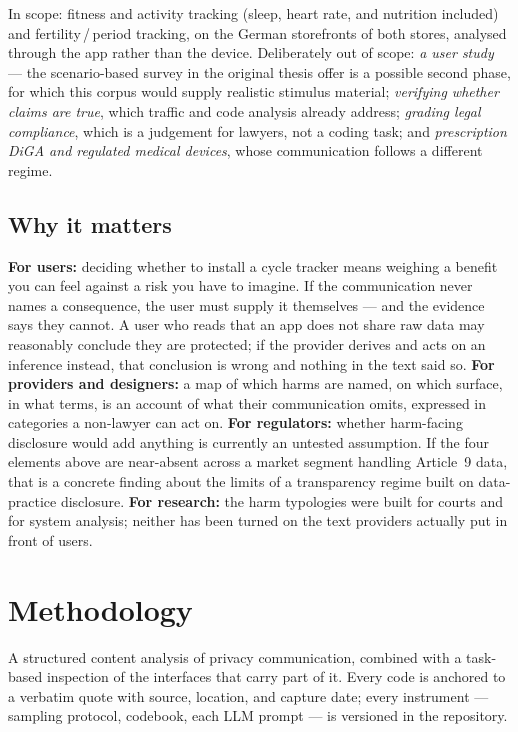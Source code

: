 \documentclass[10pt,a4paper]{article}
\begin{document}
In scope: fitness and activity tracking (sleep, heart rate, and nutrition
included) and fertility\,/\,period tracking, on the German storefronts of both
stores, analysed through the app rather than the device. Deliberately out of
scope: \emph{a user study} --- the scenario-based survey in the original thesis
offer is a possible second phase, for which this corpus would supply realistic
stimulus material; \emph{verifying whether claims are true}, which traffic and
code analysis already address; \emph{grading legal compliance}, which is a
judgement for lawyers, not a coding task; and \emph{prescription DiGA and
regulated medical devices}, whose communication follows a different regime.

\subsection*{Why it matters}

\textbf{For users:} deciding whether to install a cycle tracker means weighing a
benefit you can feel against a risk you have to imagine. If the communication
never names a consequence, the user must supply it themselves --- and the
evidence says they cannot. A user who reads that an app does not share raw data
may reasonably conclude they are protected; if the provider derives and acts on
an inference instead, that conclusion is wrong and nothing in the text said so.
\textbf{For providers and designers:} a map of which harms are named, on which
surface, in what terms, is an account of what their communication omits,
expressed in categories a non-lawyer can act on. \textbf{For regulators:}
whether harm-facing disclosure would add anything is currently an untested
assumption. If the four elements above are near-absent across a market segment
handling Article~9 data, that is a concrete finding about the limits of a
transparency regime built on data-practice disclosure. \textbf{For research:}
the harm typologies were built for courts and for system analysis; neither has
been turned on the text providers actually put in front of users.

\section{Methodology}

A structured content analysis of privacy communication, combined with a
task-based inspection of the interfaces that carry part of it. Every code is
anchored to a verbatim quote with source, location, and capture date; every
instrument --- sampling protocol, codebook, each LLM prompt --- is versioned in
the repository.
\end{document}
